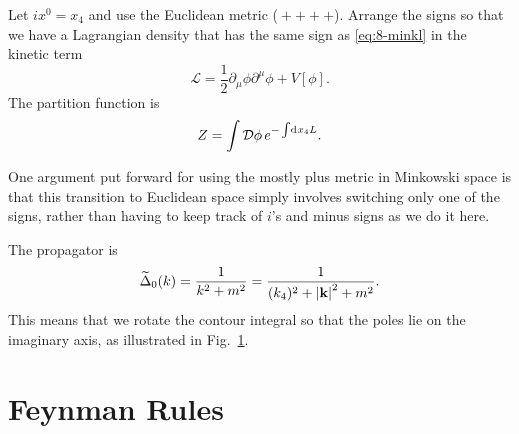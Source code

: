 Let $i x^0 = x_4$ and use the Euclidean metric (${}+ + + +{}$).
Arrange the signs so that we have a Lagrangian density that has the same sign as \eqref{eq:8-minkl} in the kinetic term
\begin{equation}
  \mathscr{L} = \frac{1}{2} \partial_{\mu} \phi \partial^{\mu} \phi + V[\phi].
\end{equation}
The partition function is 
\begin{equation}
  Z = \int \mathop{\mathcal{D} \phi} e^{- \int \dd[]{x_4} L}.
\end{equation}
\begin{leftbar}
  One argument put forward for using the mostly plus metric in Minkowski space is that this transition to Euclidean space simply involves switching only one of the signs, rather than having to keep track of $i$'s and minus signs as we do it here.
\end{leftbar}
The propagator is
\begin{equation}
  \widetilde{\Delta}_0 (k) = \frac{1}{k^2 + m^2} = \frac{1}{(k_4)^2 + \abs{\vb{k}}^2 + m^2}.
\end{equation}
This means that we rotate the contour integral so that the poles lie on the imaginary axis, as illustrated in Fig.~\ref{fig:l8f1}.
\begin{figure}[tbhp]
  \centering
  \def\svgwidth{0.4\columnwidth}
  
  \caption{}
  \label{fig:l8f1}
\end{figure}

\section{Feynman Rules}%
\label{sec:feynman_rules}

